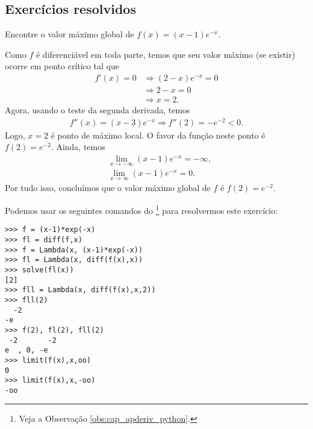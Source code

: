 \subsection{Exercícios resolvidos}


\begin{exeresol}
  Encontre o valor máximo global de $f(x) = (x-1)e^{-x}$.
\end{exeresol}
\begin{resol}
  Como $f$ é diferenciável em toda parte, temos que seu valor máximo (se existir) ocorre em ponto crítico tal que
  \begin{align}
    f'(x) = 0 &\Rightarrow (2-x)e^{-x} = 0 \\
              &\Rightarrow 2-x = 0 \\
              &\Rightarrow x = 2.
  \end{align}
  Agora, usando o teste da segunda derivada, temos
  \begin{align}
    f''(x) = (x-3)e^{-x} \Rightarrow f''(2) = -e^{-2} < 0.
  \end{align}
  Logo, $x=2$ é ponto de máximo local. O favor da função neste ponto é $f(2) = e^{-2}$. Ainda, temos
  \begin{align}
    &\lim_{x\to -\infty} (x-1)e^{-x} = -\infty, \\
    &\lim_{x\to \infty} (x-1)e^{-x} = 0.
  \end{align}
  Por tudo isso, concluímos que o valor máximo global de $f$ é $f(2) = e^{-2}$.

  \ifispython
  Podemos usar os seguintes comandos do \sympy\footnote{Veja a Observação \ref{obs:cap_apderiv_python}.} para resolvermos este exercício:
\begin{verbatim}
>>> f = (x-1)*exp(-x)
>>> fl = diff(f,x)
>>> f = Lambda(x, (x-1)*exp(-x))
>>> fl = Lambda(x, diff(f(x),x))
>>> solve(fl(x))
[2]
>>> fll = Lambda(x, diff(f(x),x,2))
>>> fll(2)
  -2
-e  
>>> f(2), fl(2), fll(2)
 -2       -2
e  , 0, -e  
>>> limit(f(x),x,oo)
0
>>> limit(f(x),x,-oo)
-oo
\end{verbatim}
  \fi
\end{resol}

